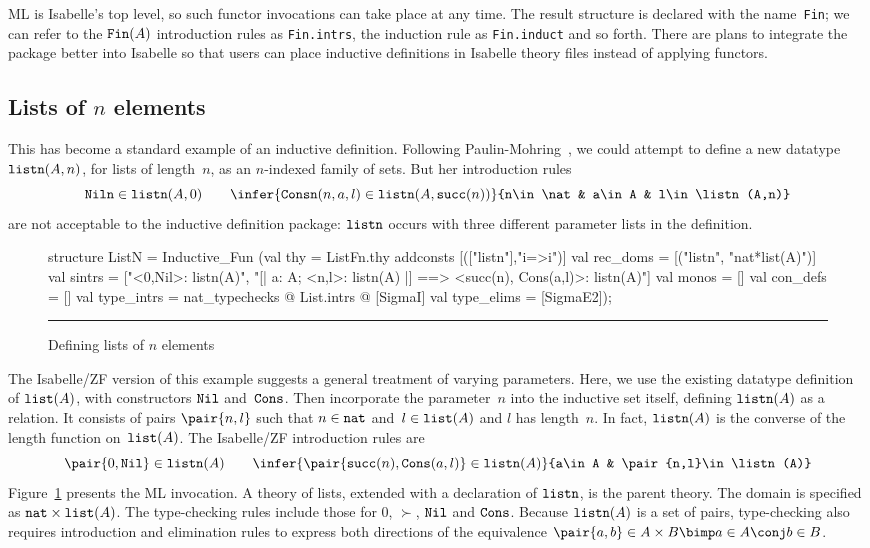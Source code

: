 ML is Isabelle's top level, so such functor invocations can take place at
any time.  The result structure is declared with the name~{\tt Fin}; we can
refer to the $\hbox{\tt Fin}(A)$ introduction rules as {\tt Fin.intrs}, the induction
rule as {\tt Fin.induct} and so forth.  There are plans to integrate the
package better into Isabelle so that users can place inductive definitions
in Isabelle theory files instead of applying functors.


\subsection{Lists of $n$ elements}\label{listn-sec}
This has become a standard example of an inductive definition.  Following
Paulin-Mohring~\cite{paulin92}, we could attempt to define a new datatype
$\hbox{\tt listn}(A,n)$, for lists of length~$n$, as an $n$-indexed family of sets.
But her introduction rules
\[ \hbox{\tt Niln}\in\listn(A,0)  \qquad
   \infer{\hbox{\tt Consn}(n,a,l)\in\listn(A,\succ(n))}
         {n\in\nat & a\in A & l\in\listn(A,n)}
\]
are not acceptable to the inductive definition package:
$\hbox{\tt listn}$ occurs with three different parameter lists in the definition.

\begin{figure}
\begin{ttbox}
structure ListN = Inductive_Fun
 (val thy        = ListFn.thy addconsts [(["listn"],"i=>i")]
  val rec_doms   = [("listn", "nat*list(A)")]
  val sintrs     = 
        ["<0,Nil>: listn(A)",
         "[| a: A;  <n,l>: listn(A) |] ==> <succ(n), Cons(a,l)>: listn(A)"]
  val monos      = []
  val con_defs   = []
  val type_intrs = nat_typechecks @ List.intrs @ [SigmaI]
  val type_elims = [SigmaE2]);
\end{ttbox}
\hrule
\caption{Defining lists of $n$ elements} \label{listn-fig}
\end{figure} 

The Isabelle/ZF version of this example suggests a general treatment of
varying parameters.  Here, we use the existing datatype definition of
$\hbox{\tt list}(A)$, with constructors $\hbox{\tt Nil}$ and~$\hbox{\tt Cons}$.  Then incorporate the
parameter~$n$ into the inductive set itself, defining $\hbox{\tt listn}(A)$ as a
relation.  It consists of pairs $\pair{n,l}$ such that $n\in\hbox{\tt nat}$
and~$l\in\hbox{\tt list}(A)$ and $l$ has length~$n$.  In fact, $\hbox{\tt listn}(A)$ is the
converse of the length function on~$\hbox{\tt list}(A)$.  The Isabelle/ZF introduction
rules are
\[ \pair{0,\Nil}\in\listn(A)  \qquad
   \infer{\pair{\succ(n),\Cons(a,l)}\in\listn(A)}
         {a\in A & \pair{n,l}\in\listn(A)}
\]
Figure~\ref{listn-fig} presents the ML invocation.  A theory of lists,
extended with a declaration of $\hbox{\tt listn}$, is the parent theory.  The domain
is specified as $\hbox{\tt nat}\times\hbox{\tt list}(A)$.  The type-checking rules include those
for 0, $\succ$, $\hbox{\tt Nil}$ and $\hbox{\tt Cons}$.  Because $\hbox{\tt listn}(A)$ is a set of pairs,
type-checking also requires introduction and elimination rules to express
both directions of the equivalence $\pair{a,b}\in A\times B \bimp a\in A
\conj b\in B$. 

